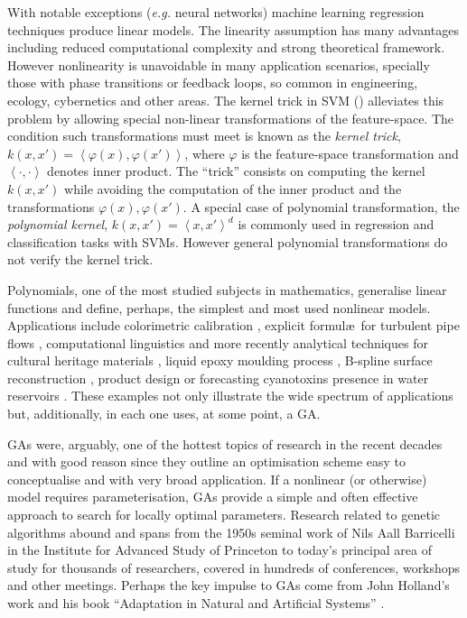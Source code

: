 \documentclass[preprint,authoryear,12pt]{elsarticle}
\newcommand{\at}[1]{\ensuremath{\!\left(#1\right)}}
\begin{document}
With notable exceptions (\emph{e.g.} neural networks) machine learning regression techniques produce linear models. The linearity assumption has many advantages including reduced computational complexity and strong the\-o\-re\-ti\-cal framework. However nonlinearity is unavoidable in many application scenarios, specially those with phase transitions or feedback loops, so common in engineering, ecology, cybernetics and other areas. The kernel trick in \ac{SVM} (\cite{scholkopf1997kernel, liang2012eigen, Bao:2013aa}) alleviates this problem by allowing special non-linear transformations of the feature-space. The condition such transformations must meet is known as the \emph{kernel trick}, $k\at{x,x'} = \left< \varphi\at{x}, \varphi\at{x'} \right>$, where $\varphi$ is the feature-space transformation and $\left<\cdot,\cdot\right>$ denotes inner product. The ``trick'' consists on computing the kernel $k\at{x,x'}$ while avoiding the computation of the inner product and the transformations $\varphi\at{x}, \varphi\at{x'}$. A special case of polynomial transformation, the \emph{polynomial kernel}, $k\at{x,x'} = \left<x,x'\right>^d$ is commonly used in regression and classification tasks with \acp{SVM}. However general polynomial transformations do not verify the kernel trick.

Polynomials, one of the most studied subjects in mathematics, generalise li\-ne\-ar functions and define, perhaps, the simplest and most used nonlinear models. Applications include colorimetric calibration \citep{Mendes:2005aa}, explicit formul\ae\ for turbulent pipe flows
 \citep{Davidson:1999aa}, computational linguistics \citep{Sanchez:2009aa} and more recently analytical techniques for cultural heritage materials \citep{Csefalvayova:2010aa}, liquid epoxy moulding process \citep{Chan:2011aa}, B-spline surface reconstruction \citep{Galvez:2012aa}, product design \citep{Chan:2012aa} or forecasting cyanotoxins presence in water reservoirs \citep{Garcia-Nieto:2013aa}. These examples not only illustrate the wide spectrum of applications but, additionally, in each one uses, at some point, a \ac{GA}.

\acp{GA} were, arguably, one of the hottest topics of research in the recent decades and with good reason since they outline an optimisation scheme easy to conceptualise and with very broad application. If a nonlinear (or otherwise) model requires parameterisation, \acp{GA} provide a simple and often effective approach to search for locally optimal parameters. Research related to genetic algorithms abound and spans from the 1950s seminal work of Nils Aall Barricelli \citep{Barricelli:1962aa} in the Institute for Advanced Study of Princeton to today's principal area of study for thousands of researchers, covered in hundreds of conferences, workshops and other meetings. Perhaps the key impulse to \acp{GA} come from John Holland's work and his book ``Adaptation in Natural and Artificial Systems'' \citep{Holland:1975aa}. 
\end{document}
